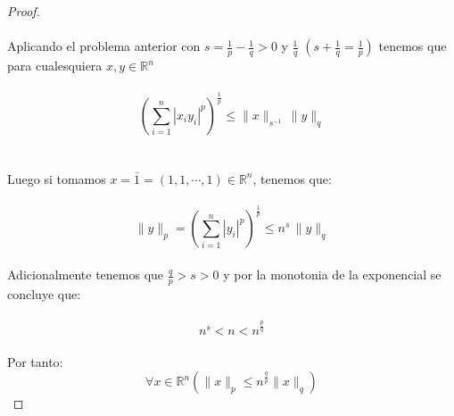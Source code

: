 \documentclass[11pt,letterpaper]{article}
\newcommand{\R}{\mathbb{R}}
\begin{document}
\begin{proof}\,\\
    \,\\
    Aplicando el problema anterior con $s=\frac{1}{p}-\frac{1}{q}>0$ y $\frac{1}{q}$ $\left(s+\frac{1}{q}=\frac{1}{p}\right)$ tenemos que para cualesquiera $x,y\in \R^n$\,\\
    \,\\
    \begin{equation*}
        \left(\sum_{i=1}^n|x_iy_i|^p\right)^{\frac{1}{p}}\leq \|x\|_{s^{-1}}\,\|y\|_q
    \end{equation*}\,\\
    \,\\
    Luego si tomamos $x=\bar{1}=(1,1,\cdots,1)\in \R^n$, tenemos que:\,\\
    \,\\
    \begin{equation*}
        \|y\|_p= \left(\sum_{i=1}^n|y_i|^p\right)^{\frac{1}{p}}\leq n^{s}\,\|y\|_q
    \end{equation*}\,\\
    Adicionalmente tenemos que $\frac{q}{p}>s>0$ y por la monotonia de la exponencial se concluye que:\,\\
    \,\\
    \begin{equation*}
        n^s<n<n^{\frac{p}{q}}
    \end{equation*}\,\\
    Por tanto:\,\\
    \begin{equation*}
        \forall x\in \R^n (\|x\|_p\leq n^{\frac{q}{p}}\|x\|_q)
    \end{equation*}
\end{proof}
\end{document}
